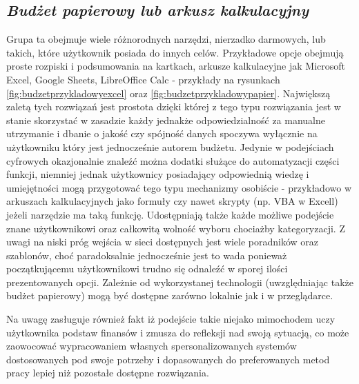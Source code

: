 \documentclass[a4paper, 10pt, twoside, openright]{report}
\newcommand{\customstylesection}[1]{\textbf{\textit{#1}}}
\begin{document}
\begin{large}
\section{\customstylesection{Budżet papierowy lub arkusz kalkulacyjny}}
{Grupa ta obejmuje wiele różnorodnych narzędzi, nierzadko darmowych, lub takich, 
które użytkownik posiada do innych celów. Przykładowe opcje obejmują proste 
rozpiski i podsumowania na kartkach, arkusze kalkulacyjne jak Microsoft 
Excel, Google Sheets, LibreOffice Calc - przykłady na rysunkach 
\ref{fig:budzetprzykladowyexcel} oraz \ref{fig:budzetprzykladowypapier}. Największą 
zaletą tych rozwiązań jest prostota dzięki której z tego typu rozwiązania jest 
w stanie skorzystać w zasadzie każdy jednakże odpowiedzialność za manualne 
utrzymanie i dbanie o jakość czy spójność danych spoczywa wyłącznie na 
użytkowniku który jest jednocześnie autorem budżetu. Jedynie w podejściach 
cyfrowych okazjonalnie znaleźć można dodatki służące do automatyzacji części 
funkcji, niemniej jednak użytkownicy posiadający odpowiednią wiedzę i 
umiejętności mogą przygotować tego typu mechanizmy osobiście - przykładowo w 
arkuszach kalkulacyjnych jako formuły czy nawet skrypty (np. VBA w Excell) 
jeżeli narzędzie ma taką funkcję. Udostępniają także każde możliwe podejście 
znane użytkownikowi oraz całkowitą wolność wyboru chociażby kategoryzacji. Z 
uwagi na niski próg wejścia w sieci dostępnych jest wiele poradników oraz 
szablonów, choć paradoksalnie jednocześnie jest to wada ponieważ początkującemu 
użytkownikowi trudno się odnaleźć w sporej ilości prezentowanych opcji. Zależnie
 od wykorzystanej technologii (uwzględniając także budżet papierowy) mogą być 
dostępne zarówno lokalnie jak i w przeglądarce.}

{Na uwagę zasługuje również fakt iż podejście takie niejako mimochodem uczy 
użytkownika podstaw finansów i zmusza do refleksji nad swoją sytuacją, co może 
zaowocować wypracowaniem własnych spersonalizowanych systemów dostosowanych pod 
swoje potrzeby i dopasowanych do preferowanych metod pracy lepiej niż pozostałe 
dostępne rozwiązania.}


\end{large}
\end{document}
